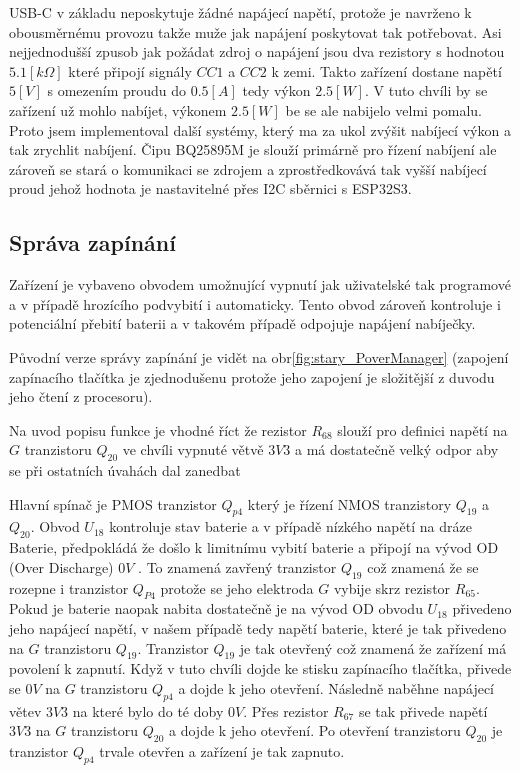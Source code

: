 USB-C v základu neposkytuje žádné napájecí napětí, protože je navrženo k obousměrnému provozu takže muže jak napájení poskytovat tak potřebovat.
Asi nejjednodušší zpusob jak požádat zdroj o napájení jsou dva rezistory s hodnotou \(5.1 [k\Omega]\) které připojí signály \(CC1\) a \(CC2\) k zemi.
Takto zařízení dostane napětí \(5 [V]\) s omezením proudu do \(0.5 [A]\) tedy výkon \(2.5 [W]\).
V tuto chvíli by se zařízení už mohlo nabíjet, výkonem \(2.5 [W]\) be se ale nabijelo velmi pomalu.
Proto jsem implementoval další systémy, který ma za ukol zvýšit nabíjecí výkon a tak zrychlit nabíjení.
Čipu BQ25895M \cite{BQ25895} je slouží primárně pro řízení nabíjení ale zároveň se stará o komunikaci se zdrojem a zprostředkovává tak vyšší nabíjecí proud jehož hodnota je nastavitelné přes I2C sběrnici s ESP32S3.

\subsection{Správa zapínání}
Zařízení je vybaveno obvodem umožnující vypnutí jak uživatelské tak programové a v případě hrozícího podvybití i automaticky.
Tento obvod zároveň kontroluje i potenciální přebití baterii a v takovém případě odpojuje napájení nabíječky.

Původní verze správy zapínání je vidět na obr\ref{fig:stary_PoverManager} (zapojení zapínacího tlačítka je zjednodušenu protože jeho zapojení je složitější z duvodu jeho čtení z procesoru).


Na uvod popisu funkce je vhodné říct že rezistor \(R_{68}\) slouží pro definici napětí na \(G\) tranzistoru \(Q_{20}\) ve chvíli vypnuté větvě \(3V3\) a má dostatečně velký odpor aby se při ostatních úvahách dal zanedbat

Hlavní spínač je PMOS tranzistor \(Q_{p4}\) který je řízení NMOS tranzistory \(Q_{19}\) a \(Q_{20}\).
Obvod \(U_{18}\) kontroluje stav baterie a v případě nízkého napětí na dráze Baterie, předpokládá že došlo k limitnímu vybití baterie a připojí na vývod OD (Over Discharge) \(0 V\) \cite{SL8261}.
To znamená zavřený tranzistor \(Q_{19}\) což znamená že se rozepne i tranzistor \(Q_{P4}\) protože se jeho elektroda \(G\) vybije skrz rezistor \(R_{65}\).
Pokud je baterie naopak nabita dostatečně je na vývod OD obvodu \(U_{18}\) přivedeno jeho napájecí napětí\cite{SL8261}, v našem případě tedy napětí baterie, které je tak přivedeno na \(G\) tranzistoru \(Q_{19}\).
Tranzistor \(Q_{19}\) je tak otevřený což znamená že zařízení má povolení k zapnutí. 
Když v tuto chvíli dojde ke stisku zapínacího tlačítka, přivede se \(0 V\) na \(G\) tranzistoru \(Q_{p4}\) a dojde k jeho otevření.
Následně naběhne napájecí větev \(3V3\) na které bylo do té doby \(0 V\).
Přes rezistor \(R_{67}\) se tak přivede napětí \(3V3\) na \(G\) tranzistoru \(Q_{20}\) a dojde k jeho otevření.
Po otevření tranzistoru \(Q_{20}\) je tranzistor \(Q_{p4}\) trvale otevřen a zařízení je tak zapnuto.

